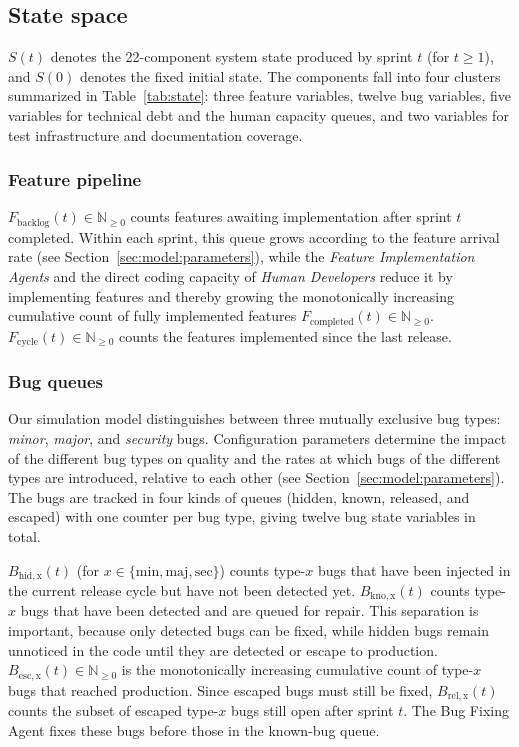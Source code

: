 \documentclass[smallextended]{svjour3}       %
\begin{document}
\subsection{State space}
\label{sec:model:state}

$S(t)$ denotes the 22-component system state produced by sprint $t$ (for $t \geq 1$), and $S(0)$ denotes the fixed initial state. The components fall into four
clusters summarized in Table~\ref{tab:state}: three feature variables, twelve bug variables, five variables for technical debt and the human capacity queues, and two variables for test infrastructure and documentation coverage.

\subsubsection{Feature pipeline}
$F_\mathrm{backlog}(t) \in \mathbb{N}_{\geq 0}$ counts features awaiting
implementation after sprint $t$ completed. Within each sprint, this queue grows according to the feature arrival rate (see Section~\ref{sec:model:parameters}), while the \textit{Feature Implementation Agents} and the
direct coding capacity of \textit{Human Developers} reduce it by implementing features and thereby growing the monotonically increasing cumulative count of fully implemented features $F_\mathrm{completed}(t) \in \mathbb{N}_{\geq 0}$. $F_\mathrm{cycle}(t) \in \mathbb{N}_{\geq 0}$ counts the features implemented since the last release.

\subsubsection{Bug queues}

Our simulation model distinguishes between three mutually exclusive bug types: \emph{minor}, \emph{major}, and \emph{security} bugs. Configuration parameters determine the impact of the different bug types on quality and the rates at which bugs of the different types are introduced, relative to each other (see Section~\ref{sec:model:parameters}). The bugs are tracked in four kinds of queues (hidden, known, released, and escaped) with one counter per bug type, giving twelve bug state variables in total.

$B_\mathrm{hid,x}(t)$ (for $x \in \{\mathrm{min, maj, sec}\}$) counts type-$x$ bugs
that have been injected in the current release cycle but have not been detected yet.
$B_\mathrm{kno,x}(t)$ counts type-$x$ bugs that have been detected and are queued for
repair. This separation is important, because only detected bugs can be fixed, while hidden bugs remain unnoticed in the code until they are detected or escape to production. $B_\mathrm{esc,x}(t) \in \mathbb{N}_{\geq 0}$ is the
monotonically increasing cumulative count of type-$x$ bugs that reached production.
Since escaped bugs must still be fixed, $B_\mathrm{rel,x}(t)$ counts the subset of
escaped type-$x$ bugs still open after sprint $t$. The Bug Fixing Agent fixes these bugs before those in the known-bug queue.
\end{document}
